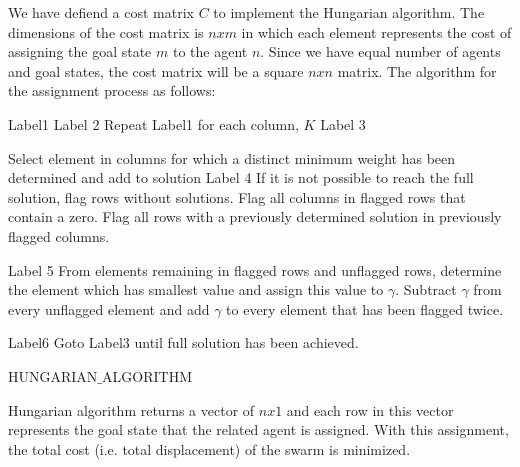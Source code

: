 We have defiend a cost matrix  $C$ to implement the Hungarian algorithm. The dimensions of the cost matrix is $nxm$ in which each element represents the cost of assigning the goal state $m$ to the agent $n$.  Since we have equal number of agents and goal states, the cost matrix will be a square $nxn$ matrix.  The algorithm for the assignment process as follows:
	
\begin{algorithm}[H]
Label1  \;
Label 2  \; 
{Repeat Label1 for each column, $K$}
Label 3  \; 

Select element in columns for which a distinct minimum weight has been determined and add to solution \newline
Label 4 \;
If it is not possible to reach the full solution, flag rows without solutions. Flag all columns in flagged rows that contain a zero. Flag all rows with a previously determined solution in previously flagged columns.
     
Label 5 \;
From elements remaining in flagged rows and unflagged rows, determine the element which has smallest value and assign this value to $\gamma$. Subtract $\gamma$  from every unflagged element and add  $\gamma$ to every element that has been flagged twice.
     
Label6 \;
Goto Label3 until full solution has been achieved. \newline    
\caption{HUNGARIAN$\_$ALGORITHM}
\end{algorithm}

Hungarian algorithm returns a vector of $nx1$ and each row in this vector represents the goal state that the related agent is assigned. With this assignment, the total cost (i.e. total displacement) of the swarm is minimized. 
